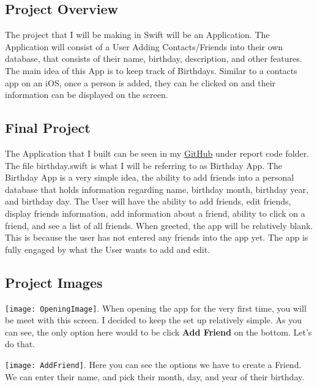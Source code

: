 \documentclass{article}
\theoremstyle{theorem}
\theoremstyle{definition}
\theoremstyle{remark}
\begin{document}
\subsection{Project Overview}
The project that I will be making in Swift will be an Application. The Application will consist of a User Adding Contacts/Friends into their own database, that consists of their name, birthday, description, and other features. The main idea of this App is to keep track of Birthdays. Similar to a contacts app on an iOS, once a person is added, they can be clicked on and their information can be displayed on the screen. 

\subsection{Final Project}
The Application that I built can be seen in my \href{https://github.com/everettprussak/CPSC354}{GitHub} under report code folder. The file birthday.swift is what I will be referring to as Birthday App. The Birthday App is a very simple idea, the ability to add friends into a personal database that holds information regarding name, birthday month, birthday year, and birthday day. The User will have the ability to add friends, edit friends, display friends information, add information about a friend, ability to click on a friend, and see a list of all friends. When greeted, the app will be relatively blank. This is because the user has not entered any friends into the app yet. The app is fully engaged by what the User wants to add and edit. 

\subsection{Project Images}
\texttt{[image: OpeningImage]}\noindent{}. When opening the app for the very first time, you will be meet with this screen. I decided to keep the set up relatively simple. As you can see, the only option here would to be click \textbf{Add Friend} on the bottom. Let's do that.\newline\newline

\texttt{[image: AddFriend]}\noindent{}. Here you can see the options we have to create a Friend. We can enter their name, and pick their month, day, and year of their birthday. \newline\newline
\end{document}

